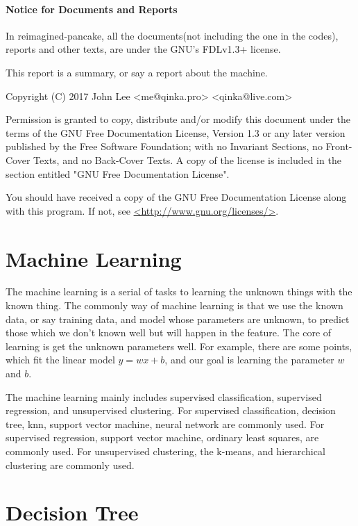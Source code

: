 \documentclass{article}
\begin{document}
\paragraph{Notice for Documents and Reports}

In reimagined-pancake, all the documents(not including the one in the codes), reports and other texts,
are under the GNU's FDLv1.3+ license.

This report is a summary, or say a report about the machine.

Copyright (C)  2017 John Lee <me@qinka.pro> <qinka@live.com>

Permission is granted to copy, distribute and/or modify this document
under the terms of the GNU Free Documentation License, Version 1.3
or any later version published by the Free Software Foundation;
with no Invariant Sections, no Front-Cover Texts, and no Back-Cover Texts.
A copy of the license is included in the section entitled "GNU
Free Documentation License".

You should have received a copy of the GNU Free Documentation License
along with this program.  If not, see \href{http://www.gnu.org/licenses}{<http://www.gnu.org/licenses/>}.

\section{Machine Learning}
\label{sec:ml}

The machine learning is a serial of tasks to learning the unknown things with the known thing.
The commonly way of machine learning is that we use the known data, or say training data, and model whose parameters are unknown,
to predict those which we don't known well but will happen in the feature.  The core of learning is get the unknown parameters well.
For example, there are some points, which fit the linear model $y = wx+b$, and our goal is learning the parameter $w$ and $b$.

The machine learning mainly includes supervised classification, supervised regression, and unsupervised clustering.
For supervised classification, decision tree, knn, support vector machine, neural network are commonly used.
For supervised regression, support vector machine, ordinary least squares, are commonly used.
For unsupervised clustering, the k-means, and hierarchical clustering are commonly used.

\section{Decision Tree}
\label{sec:decisiontree}
\end{document}
